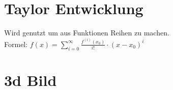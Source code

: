\documentclass[12pt,a4paper]{article}
\begin{document}
\section{Taylor Entwicklung}
	Wird genutzt um aus Funktionen Reihen zu machen.\\ 
	Formel: $f(x) = \sum_{i = 0}^{\infty} \frac{f^{(i)}(x_0)}{i!} \cdot (x-x_0)^i$

\section{3d Bild} %
	
\end{document}
